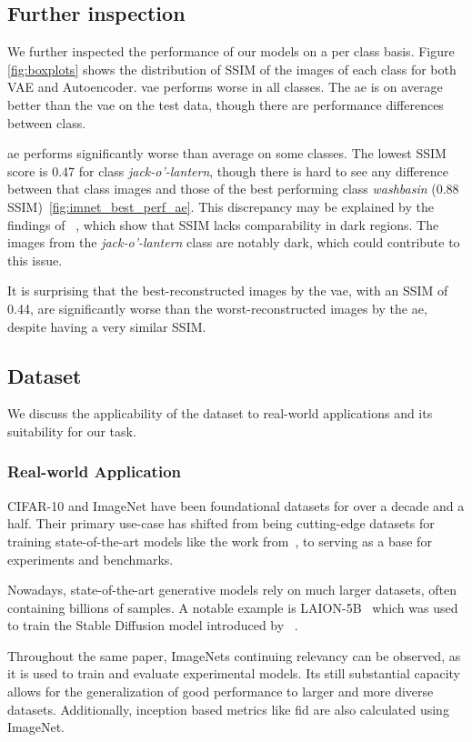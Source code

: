 \subsection{Further inspection}
We further inspected the performance of our models on a per class basis. Figure \ref{fig:boxplots} shows the distribution of SSIM of the images of each class for both VAE and Autoencoder. \ac{vae} performs worse in all classes. The \ac{ae} is on average better than the \ac{vae} on the test data, though there are performance differences between class. 

\ac{ae} performs significantly worse than average on some classes.
The lowest SSIM score is 0.47 for class \textit{jack-o'-lantern}, though there is
hard to see any difference between that class images and those of the best performing class
\textit{washbasin} (0.88 SSIM)~\ref{fig:imnet_best_perf_ae}.
This discrepancy may be explained by the findings of ~\cite{understandingssim}, which show that SSIM lacks
comparability in dark regions. The images from the \textit{jack-o'-lantern} class are notably dark, which could contribute to this issue.

It is surprising that the best-reconstructed images by the \ac{vae}, with an SSIM of 0.44, are significantly worse than the worst-reconstructed images by the \ac{ae}, despite having a very similar SSIM.

\subsection{Dataset}\label{subsec:dataset}
We discuss the applicability of the dataset to real-world applications and its suitability for our task.
\subsubsection{Real-world Application}
CIFAR-10 and ImageNet have been foundational datasets for over a decade and a half.
Their primary use-case has shifted from being cutting-edge datasets for training state-of-the-art models like the
work from~\cite{AlexNet}, to serving as a base for experiments and benchmarks.

Nowadays, state-of-the-art generative models rely on much larger datasets, often containing billions of samples.
A notable example is LAION-5B~\cite{laion5b} which was used to train the Stable Diffusion model introduced by~
\cite{stable_diff}.

Throughout the same paper, ImageNets continuing relevancy can be observed, as it is used to train and evaluate
experimental models.
Its still substantial capacity allows for the generalization of good performance to larger and more diverse datasets.
Additionally, inception based metrics like \ac{fid} are also calculated using ImageNet.

